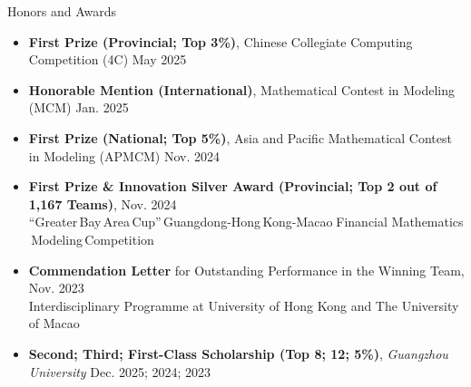 \documentclass{resume} %
\begin{document}
\begin{rSection}{Honors and Awards}
	
	\begin{itemize}[left = -0.22in]
		
		
		\item
		\textbf{First Prize (Provincial; Top 3\%)},
		Chinese Collegiate Computing Competition (4C)
		\hfill{May 2025}
		
		\item 
		\textbf{Honorable Mention (International)}, 
		Mathematical Contest in Modeling
		(MCM)
		\hfill{Jan. 2025}
		
		\item 
		\textbf{First Prize (\textbf{National; Top 5\%})}, Asia and Pacific Mathematical Contest in Modeling
		(APMCM) 
		\hfill{Nov. 2024}
		
		\item 
		\textbf{First Prize \& Innovation Silver Award (\textbf{Provincial; \textbf{Top 2} out of \textbf{1,167} Teams})},
		\hfill{Nov. 2024}\\
		“Greater$\,$Bay$\,$Area$\,$Cup”$\,$Guangdong-Hong$\,$Kong-Macao$\;$Financial Mathematics$\,$Modeling$\,$Competition
		
		\item
		\textbf{Commendation Letter} for Outstanding Performance in the Winning Team,
		\hfill{Nov. 2023}\\
		Interdisciplinary Programme at University of Hong Kong and The University of Macao
		
		\item 
		\textbf{Second; Third; First-Class Scholarship (\textbf{Top 8; 12; 5\%})}, \textit{Guangzhou University} 
		\hfill{Dec. 2025; 2024; 2023}
		

	\end{itemize}
	
\end{rSection} 
\end{document}
